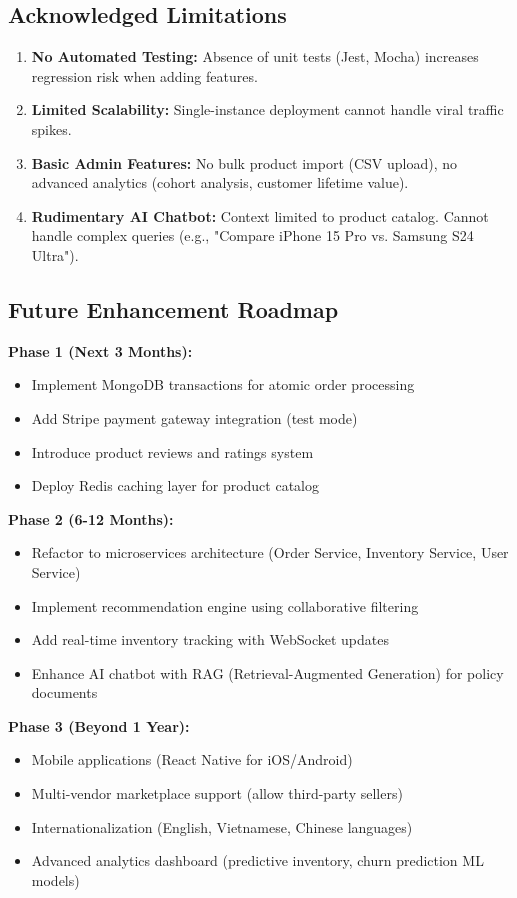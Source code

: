 \subsection{Acknowledged Limitations}

\begin{enumerate}
    \item \textbf{No Automated Testing:} Absence of unit tests (Jest, Mocha) increases regression risk when adding features.
    \item \textbf{Limited Scalability:} Single-instance deployment cannot handle viral traffic spikes.
    \item \textbf{Basic Admin Features:} No bulk product import (CSV upload), no advanced analytics (cohort analysis, customer lifetime value).
    \item \textbf{Rudimentary AI Chatbot:} Context limited to product catalog. Cannot handle complex queries (e.g., "Compare iPhone 15 Pro vs. Samsung S24 Ultra").
\end{enumerate}

\subsection{Future Enhancement Roadmap}

\textbf{Phase 1 (Next 3 Months):}
\begin{itemize}
    \item Implement MongoDB transactions for atomic order processing
    \item Add Stripe payment gateway integration (test mode)
    \item Introduce product reviews and ratings system
    \item Deploy Redis caching layer for product catalog
\end{itemize}

\textbf{Phase 2 (6-12 Months):}
\begin{itemize}
    \item Refactor to microservices architecture (Order Service, Inventory Service, User Service)
    \item Implement recommendation engine using collaborative filtering
    \item Add real-time inventory tracking with WebSocket updates
    \item Enhance AI chatbot with RAG (Retrieval-Augmented Generation) for policy documents
\end{itemize}

\textbf{Phase 3 (Beyond 1 Year):}
\begin{itemize}
    \item Mobile applications (React Native for iOS/Android)
    \item Multi-vendor marketplace support (allow third-party sellers)
    \item Internationalization (English, Vietnamese, Chinese languages)
    \item Advanced analytics dashboard (predictive inventory, churn prediction ML models)
\end{itemize}

